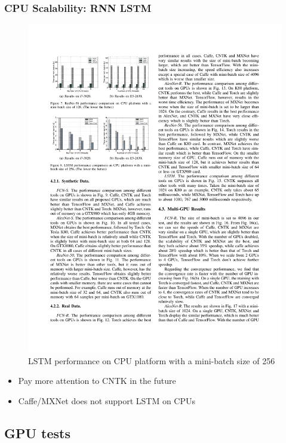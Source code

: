 \begin{frame}
	\MyLogo
	\frametitle{CPU Scalability: RNN LSTM}  
	\begin{figure}[htbp] 
		\includegraphics[width=\linewidth]{figures/LSTM1.pdf} 
		\caption{LSTM performance on CPU platform with a mini-batch size of 256}
	\end{figure}
	
\vskip -10pt
\begin{mdframed}[style=mystyle1]
\begin{itemize}
\item Pay more attention to CNTK in the future
\item Caffe/MXNet does not support LSTM on CPUs
\end{itemize}
\end{mdframed}

\end{frame}

\subsection{GPU tests}

